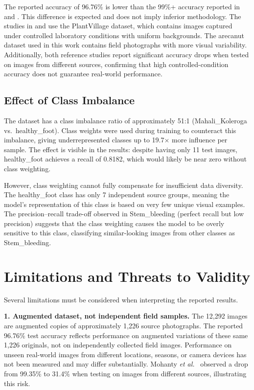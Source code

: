 \documentclass[conference]{IEEEtran}
\begin{document}
The reported accuracy of 96.76\% is lower than the 99\%+ accuracy reported in \cite{mohanty2016} and \cite{ferentinos2018}. This difference is expected and does not imply inferior methodology. The studies in \cite{mohanty2016} and \cite{ferentinos2018} use the PlantVillage dataset, which contains images captured under controlled laboratory conditions with uniform backgrounds. The arecanut dataset used in this work contains field photographs with more visual variability. Additionally, both reference studies report significant accuracy drops when tested on images from different sources, confirming that high controlled-condition accuracy does not guarantee real-world performance.

\subsection{Effect of Class Imbalance}

The dataset has a class imbalance ratio of approximately 51:1 (Mahali\_Koleroga vs.\ healthy\_foot). Class weights were used during training to counteract this imbalance, giving underrepresented classes up to 19.7$\times$ more influence per sample. The effect is visible in the results: despite having only 11 test images, healthy\_foot achieves a recall of 0.8182, which would likely be near zero without class weighting.

However, class weighting cannot fully compensate for insufficient data diversity. The healthy\_foot class has only 7 independent source groups, meaning the model's representation of this class is based on very few unique visual examples. The precision--recall trade-off observed in Stem\_bleeding (perfect recall but low precision) suggests that the class weighting causes the model to be overly sensitive to this class, classifying similar-looking images from other classes as Stem\_bleeding.

\section{Limitations and Threats to Validity}
\label{sec:limitations}

Several limitations must be considered when interpreting the reported results.

\textbf{1. Augmented dataset, not independent field samples.} The 12{,}292 images are augmented copies of approximately 1{,}226 source photographs. The reported 96.76\% test accuracy reflects performance on augmented variations of these same 1{,}226 originals, not on independently collected field images. Performance on unseen real-world images from different locations, seasons, or camera devices has not been measured and may differ substantially. Mohanty \textit{et al.}~\cite{mohanty2016} observed a drop from 99.35\% to 31.4\% when testing on images from different sources, illustrating this risk.
\end{document}
